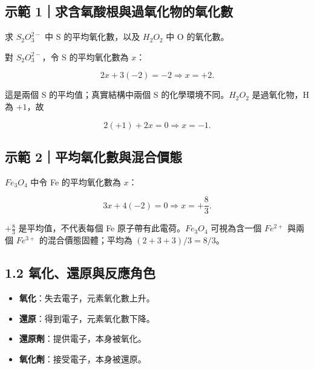 \documentclass[11pt,a4paper]{article}
\providecommand{\tightlist}{%
  \setlength{\itemsep}{0pt}\setlength{\parskip}{0pt}}
\begin{document}
\begin{HandoutWorkedExample}

\subsection{示範 1｜求含氧酸根與過氧化物的氧化數}\label{ux793aux7bc4-1ux6c42ux542bux6c27ux9178ux6839ux8207ux904eux6c27ux5316ux7269ux7684ux6c27ux5316ux6578}

求 \(S_2O_3^{2-}\) 中 S 的平均氧化數，以及 \(H_2O_2\) 中 O 的氧化數。

對 \(S_2O_3^{2-}\)，令 S 的平均氧化數為 \(x\)：

\[
2x+3(-2)=-2\Rightarrow x=+2.
\]

這是兩個 S 的平均值；真實結構中兩個 S 的化學環境不同。\(H_2O_2\) 是過氧化物，H 為 \(+1\)，故

\[
2(+1)+2x=0\Rightarrow x=-1.
\]

\end{HandoutWorkedExample}

\begin{HandoutWorkedExample}

\subsection{示範 2｜平均氧化數與混合價態}\label{ux793aux7bc4-2ux5e73ux5747ux6c27ux5316ux6578ux8207ux6df7ux5408ux50f9ux614b}

\(Fe_3O_4\) 中令 Fe 的平均氧化數為 \(x\)：

\[
3x+4(-2)=0\Rightarrow x=+\frac83.
\]

\(+\tfrac83\) 是平均值，不代表每個 Fe 原子帶有此電荷。\(Fe_3O_4\) 可視為含一個 \(Fe^{2+}\) 與兩個 \(Fe^{3+}\) 的混合價態固體；平均為 \((2+3+3)/3=8/3\)。

\end{HandoutWorkedExample}

\subsection{1.2 氧化、還原與反應角色}\label{ux6c27ux5316ux9084ux539fux8207ux53cdux61c9ux89d2ux8272}

\begin{itemize}
\tightlist
\item
  \textbf{氧化}：失去電子，元素氧化數上升。
\item
  \textbf{還原}：得到電子，元素氧化數下降。
\item
  \textbf{還原劑}：提供電子，本身被氧化。
\item
  \textbf{氧化劑}：接受電子，本身被還原。
\end{itemize}
\end{document}
